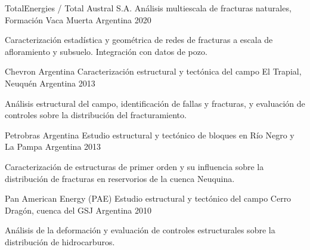 
\begin{cventries}

\cventry
    {TotalEnergies / Total Austral S.A.}
    {Análisis multiescala de fracturas naturales, Formación Vaca Muerta}
    {Argentina}
    {2020}
    {
      \begin{cvitems}
        \item {Caracterización estadística y geométrica de redes de fracturas a escala de afloramiento y subsuelo. Integración con datos de pozo.}
      \end{cvitems}
    }

\cventry
    {Chevron Argentina}
    {Caracterización estructural y tectónica del campo El Trapial, Neuquén}
    {Argentina}
    {2013}
    {
      \begin{cvitems}
        \item {Análisis estructural del campo, identificación de fallas y fracturas, y evaluación de controles sobre la distribución del fracturamiento.}
      \end{cvitems}
    }

\cventry
    {Petrobras Argentina}
    {Estudio estructural y tectónico de bloques en Río Negro y La Pampa}
    {Argentina}
    {2013}
    {
      \begin{cvitems}
        \item {Caracterización de estructuras de primer orden y su influencia sobre la distribución de fracturas en reservorios de la cuenca Neuquina.}
      \end{cvitems}
    }

\cventry
    {Pan American Energy (PAE)}
    {Estudio estructural y tectónico del campo Cerro Dragón, cuenca del GSJ}
    {Argentina}
    {2010}
    {
      \begin{cvitems}
        \item {Análisis de la deformación y evaluación de controles estructurales sobre la distribución de hidrocarburos.}
      \end{cvitems}
    }

\end{cventries}
